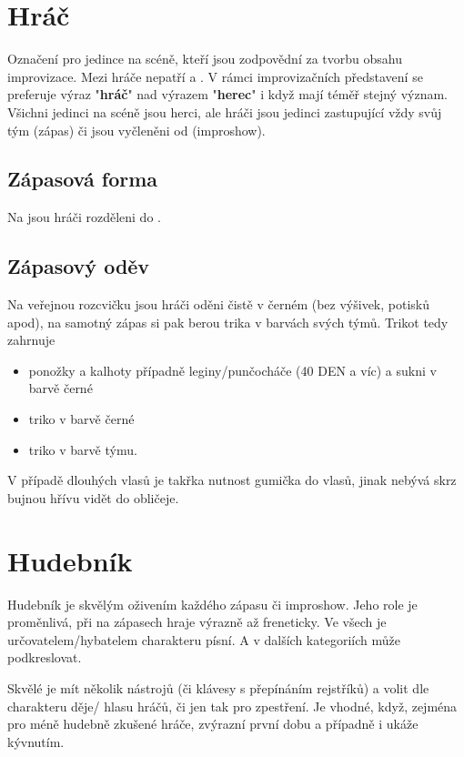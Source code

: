 \documentclass[main.tex]{subfiles}
\begin{document}
\needspace{5cm} \section{Hráč} \label{hráč} Označení pro jedince na scéně, kteří jsou zodpovědní za tvorbu obsahu improvizace. Mezi hráče nepatří  a . V rámci improvizačních představení se preferuje výraz "\textbf{hráč}{}"{} nad výrazem "\textbf{herec}{}"{} i když mají téměř stejný význam. Všichni jedinci na scéně jsou herci, ale hráči jsou jedinci zastupující vždy svůj tým (zápas) či jsou vyčleněni od  (improshow).  
 
\subsection{ Zápasová forma } Na  jsou hráči rozděleni do . 
 
\subsection{ Zápasový oděv } Na veřejnou rozcvičku jsou hráči oděni čistě v černém (bez výšivek, potisků apod),  
na samotný zápas si pak berou trika v barvách svých týmů. 
Trikot tedy zahrnuje 
\begin{itemize}
\item ponožky a kalhoty   případně leginy/punčocháče (40 DEN a víc) a sukni v barvě černé
\item triko v barvě černé
\item triko v barvě týmu.
\end{itemize}
V případě dlouhých vlasů je takřka nutnost gumička do vlasů, jinak nebývá skrz bujnou hřívu vidět do obličeje. 
 
 
 
 
 
\needspace{5cm} \section{Hudebník} \label{hudebník} Hudebník je skvělým oživením každého zápasu či improshow. 
Jeho role je proměnlivá, při  na zápasech hraje výrazně až freneticky. 
Ve všech  je určovatelem/hybatelem charakteru písní. 
A v dalších kategoriích může podkreslovat. 
 
Skvělé je mít několik nástrojů (či klávesy s přepínáním rejstříků) a volit dle charakteru děje/ hlasu hráčů, či jen tak pro zpestření. 
Je vhodné, když, zejména pro méně hudebně zkušené hráče, zvýrazní první dobu a případně i ukáže kývnutím. 
 
\end{document}
